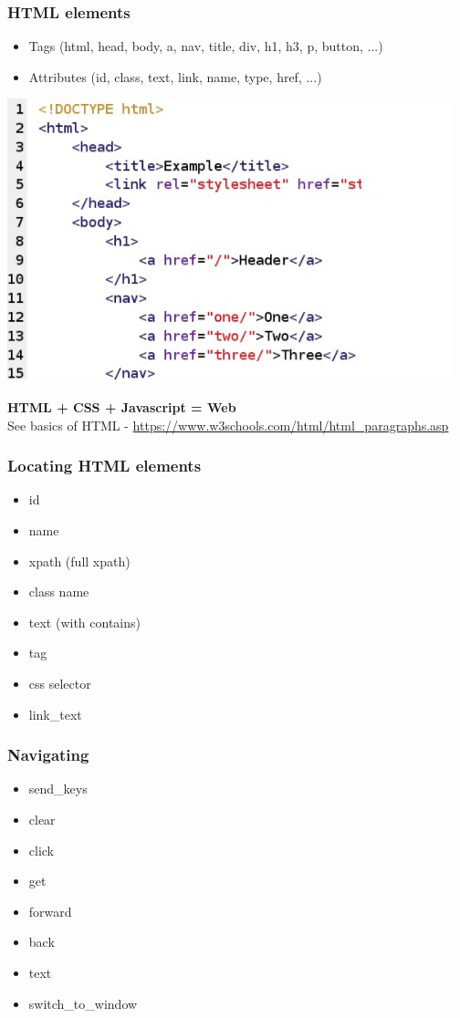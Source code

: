 \documentclass{beamer}
\begin{document}
\begin{frame}
\frametitle{HTML elements}
    \begin{itemize}
        \item Tags (html, head, body, a, nav, title, div, h1, h3, p, button, ...)
        \item Attributes (id, class, text, link, name, type, href, ...)
    \end{itemize}
\centering
\includegraphics[scale=0.5]{figures/html.jpg}

\begin{flushleft}
    \textbf{HTML + CSS + Javascript = Web} \\
    See basics of HTML - \url{https://www.w3schools.com/html/html_paragraphs.asp}    
\end{flushleft}

\end{frame}

\begin{frame}
    \frametitle{Locating HTML elements}
    \begin{itemize}
        \item id
        \item name
        \item xpath (full xpath)
        \item class name
        \item text (with contains)
        \item tag
        \item css selector
        \item link\_text
    \end{itemize}
\end{frame}

\begin{frame}
    \frametitle{Navigating}
    \begin{itemize}
        \item send\_keys
        \item clear
        \item click
        \item get
        \item forward
        \item back
        \item text
        \item switch\_to\_window
    \end{itemize}
\end{frame}
\end{document}
